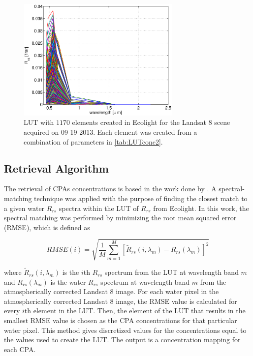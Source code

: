\documentclass[onecolumn,3p,letterpaper]{elsarticle}
\begin{document}
\begin{figure}[htb]
    \centering
      \includegraphics[height=6cm]{./Images/LUTsmart130919_150422.eps}
      \caption{LUT with $1170$ elements created in Ecolight for the Landsat 8 scene acquired on 09-19-2013. Each element was created from a combination of parameters in \autoref{tab:LUTconc2}.}
      \label{fig:LUT}
\end{figure}

\subsection{Retrieval Algorithm} 
\label{subsec:Retrieval}
The retrieval of CPAs concentrations is based in the work done by \cite*{Gerace:2013}. A spectral-matching technique was applied with the purpose of finding the closest match to a given water $R_{rs}$ spectra within the LUT of $R_{rs}$ from Ecolight. In this work, the spectral matching was performed by minimizing the root mean squared error (RMSE), which is defined as

\begin{equation}
  RMSE(i) = \sqrt{\frac{1}{M}\sum_{m=1}^M\left[\widetilde{R}_{rs}(i,\lambda_m)-R_{rs}(\lambda_m)\right]^2}
\end{equation}

\noindent where $\widetilde{R}_{rs}(i,\lambda_m)$ is the $i$th $R_{rs}$ spectrum from the LUT at wavelength band $m$ and $R_{rs}(\lambda_m)$ is the water $R_{rs}$ spectrum at wavelength band $m$ from the atmospherically corrected Landsat 8 image. For each water pixel in the atmospherically corrected Landsat 8 image, the RMSE value is calculated for every $i$th element in the LUT. Then, the element of the LUT that results in the smallest RMSE value is chosen as the CPA concentrations for that particular water pixel. This method gives discretized values for the concentrations equal to the values used to create the LUT. The output is a concentration mapping for each CPA.
\end{document}
